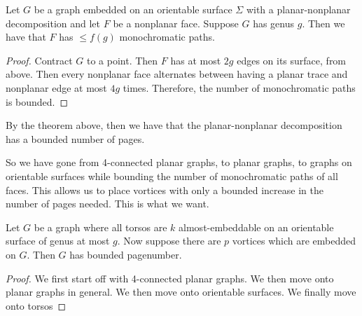 \begin{corollary}
	Let \(G\) be a graph embedded on an orientable surface \(\Sigma\) with a planar-nonplanar decomposition and let \(F\) be a nonplanar face. Suppose \(G\) has genus \(g\). Then we have that \(F\) has \(\leq f(g)\) monochromatic paths.
\end{corollary}

\begin{proof}
	Contract \(G\) to a point. Then \(F\) has at most \(2g\) edges on its surface, from above. 
	Then every nonplanar face alternates between having a planar trace and nonplanar edge at most \(4g\) times. Therefore, the number of monochromatic paths is bounded.
\end{proof}

By the theorem above, then we have that the planar-nonplanar decomposition has a bounded number of pages.

So we have gone from 4-connected planar graphs, to planar graphs, to graphs on orientable surfaces while bounding the number of monochromatic paths of all faces. This allows us to place vortices with only a bounded increase in the number of pages needed. This is what we want. 
\begin{theorem}\label{thm:orientablevortices}
	Let $G$ be a graph where all torsos are $k$ almost-embeddable on an orientable surface of genus at most $g$. Now suppose there are $p$ vortices which are embedded on $G$. Then $G$ has bounded pagenumber.
\end{theorem}
\begin{proof}
	We first start off with 4-connected planar graphs.
	We then move onto planar graphs in general.
	We then move onto orientable surfaces.
	We finally move onto torsos
\end{proof}